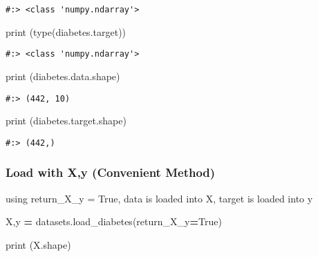 \documentclass[
]{book}
\newenvironment{Shaded}{\begin{snugshade}}{\end{snugshade}}
\newcommand{\BuiltInTok}[1]{#1}
\newcommand{\NormalTok}[1]{#1}
\newcommand{\OperatorTok}[1]{\textcolor[rgb]{0.43,0.43,0.43}{\textbf{#1}}}
\newcommand{\VariableTok}[1]{\textcolor[rgb]{0,0,0}{#1}}
\begin{document}
\begin{verbatim}
#:> <class 'numpy.ndarray'>
\end{verbatim}

\begin{Shaded}
\begin{Highlighting}[]
\BuiltInTok{print}\NormalTok{ (}\BuiltInTok{type}\NormalTok{(diabetes.target))}
\end{Highlighting}
\end{Shaded}

\begin{verbatim}
#:> <class 'numpy.ndarray'>
\end{verbatim}

\begin{Shaded}
\begin{Highlighting}[]
\BuiltInTok{print}\NormalTok{ (diabetes.data.shape)}
\end{Highlighting}
\end{Shaded}

\begin{verbatim}
#:> (442, 10)
\end{verbatim}

\begin{Shaded}
\begin{Highlighting}[]
\BuiltInTok{print}\NormalTok{ (diabetes.target.shape)}
\end{Highlighting}
\end{Shaded}

\begin{verbatim}
#:> (442,)
\end{verbatim}

\hypertarget{load-with-xy-convenient-method}{%
\subsubsection{Load with X,y (Convenient Method)}\label{load-with-xy-convenient-method}}

using return\_X\_y = True, data is loaded into X, target is loaded into y

\begin{Shaded}
\begin{Highlighting}[]
\NormalTok{X,y      }\OperatorTok{=}\NormalTok{ datasets.load\_diabetes(return\_X\_y}\OperatorTok{=}\VariableTok{True}\NormalTok{)}
\end{Highlighting}
\end{Shaded}

\begin{Shaded}
\begin{Highlighting}[]
\BuiltInTok{print}\NormalTok{ (X.shape)}
\end{Highlighting}
\end{Shaded}
\end{document}
